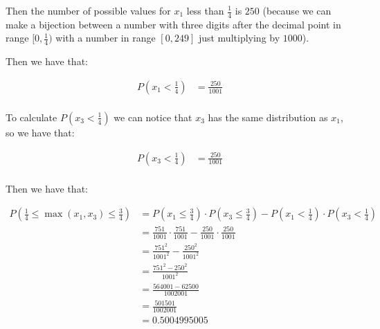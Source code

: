 Then the number of possible values for $x_1$ less than $\frac{1}{4}$
is $250$ (because we can make a bijection between a number with three
digits after the decimal point in range $[0,\frac{1}{4})$ with a
number in range $[0,249]$ just multiplying by $1000$).

Then we have that:

\begin{equation*}
    \begin{split}
        P(x_1 < \frac{1}{4}) & = \frac{250}{1001} \\
    \end{split}
\end{equation*}

To calculate $P(x_3 < \frac{1}{4})$ we can notice that $x_3$ has
the same distribution as $x_1$, so we have that:

\begin{equation*}
    \begin{split}
        P(x_3 < \frac{1}{4}) & = \frac{250}{1001} \\
    \end{split}
\end{equation*}

Then we have that:

\begin{equation*}
    \begin{split}
        P(\frac{1}{4}\leq\max(x_1, x_3)\leq\frac{3}{4}) & = P(x_1 \leq \frac{3}{4}) \cdot P(x_3 \leq \frac{3}{4}) - P(x_1 < \frac{1}{4}) \cdot P(x_3 < \frac{1}{4}) \\
                                                        & = \frac{751}{1001} \cdot \frac{751}{1001} - \frac{250}{1001} \cdot \frac{250}{1001}                       \\
                                                        & = \frac{751^2}{1001^2} - \frac{250^2}{1001^2}                                                             \\
                                                        & = \frac{751^2 - 250^2}{1001^2}                                                                            \\
                                                        & = \frac{564001 - 62500}{1002001}                                                                          \\
                                                        & = \frac{501501}{1002001}                                                                                  \\
                                                        & = 0.5004995005
    \end{split}
\end{equation*}